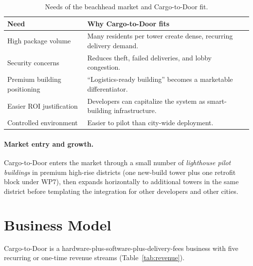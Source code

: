 \documentclass[11pt,a4paper]{report}
\begin{document}
\begin{table}[H]
\centering
\caption{Needs of the beachhead market and Cargo-to-Door fit.}
\label{tab:market-fit}
\small
\begin{tabularx}{\linewidth}{L{4.5cm} X}
\toprule
\textbf{Need} & \textbf{Why Cargo-to-Door fits} \\
\midrule
High package volume               & Many residents per tower create dense, recurring delivery demand. \\
Security concerns                 & Reduces theft, failed deliveries, and lobby congestion. \\
Premium building positioning      & ``Logistics-ready building'' becomes a marketable differentiator. \\
Easier ROI justification          & Developers can capitalize the system as smart-building infrastructure. \\
Controlled environment            & Easier to pilot than city-wide deployment. \\
\bottomrule
\end{tabularx}
\end{table}

\paragraph{Market entry and growth.}
Cargo-to-Door enters the market through a small number of
\emph{lighthouse pilot buildings} in premium high-rise districts (one
new-build tower plus one retrofit block under WP7), then expands
horizontally to additional towers in the same district before
templating the integration for other developers and other cities.

\section{Business Model}
\label{sec:business-model}

Cargo-to-Door is a hardware-plus-software-plus-delivery-fees business
with five recurring or one-time revenue streams
(Table~\ref{tab:revenue}).
\end{document}
